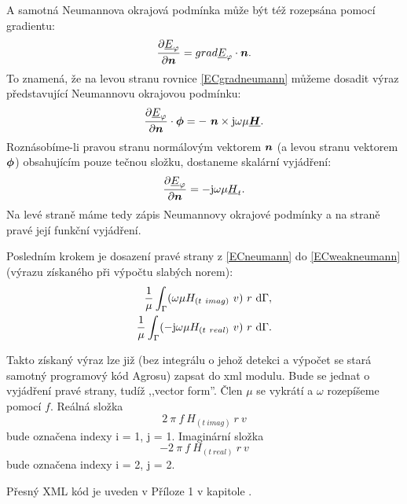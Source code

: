 \documentclass[12pt,a4paper,oneside]{article}
\numberwithin{equation}{section} %
\numberwithin{figure}{section} %
\numberwithin{table}{section} %
\newcommand{\mj}{\mathrm{j}} %
\renewcommand{\vec}[1]{\mbox{\boldmath$#1$}} %
\newcommand{\faz}[1]{{\underline{#1}}} %
\begin{document}
A samotná Neumannova okrajová podmínka může být též rozepsána pomocí gradientu:
\begin{equation}
\label{ECgradneumann}
\frac{\partial \faz{E} _{\varphi}}{\partial \vec{n}} = grad \faz{E} _{\varphi} \cdot \vec{n} .
\end{equation}
To znamená, že na levou stranu rovnice \ref{ECgradneumann} můžeme dosadit výraz představující Neumannovu okrajovou podmínku:
\begin{equation}
\frac{\partial \faz{E}_{\varphi}}{\partial \vec{n}} \cdot \vec{\phi} = - ~ \vec{n} \times \mj \omega \mu \faz{\vec{H}} .
\end{equation}
Roznásobíme-li pravou stranu normálovým vektorem $\vec{n}$ (a levou stranu vektorem $\vec{\phi}$) obsahujícím pouze tečnou složku, dostaneme skalární vyjádření:
\begin{equation}
\label{ECneumann}
\frac{\partial \faz{E}_{\varphi}}{\partial \vec{n}} = - \mj \omega \mu \faz{H}_t .
\end{equation}
Na levé straně máme tedy zápis Neumannovy okrajové podmínky a na straně pravé její funkční vyjádření.

Posledním krokem je dosazení pravé strany z \ref{ECneumann} do \ref{ECweakneumann} (výrazu získaného při výpočtu slabých norem):
\begin{subequations}
\begin{align}
\frac{1}{\mu} \int _{\Gamma} ( \omega \mu H_{(t~imag)} ~ v ) ~ r ~ \ud \Gamma ,
\\ 
\frac{1}{\mu} \int _{\Gamma} ( - \mj \omega \mu H_{(t~real)} ~ v ) ~ r ~ \ud \Gamma .
\end{align}
\end{subequations}

Takto získaný výraz lze již (bez integrálu o jehož detekci a výpočet se stará samotný programový kód Agrosu) zapsat do xml modulu. Bude se jednat o vyjádření pravé strany, tudíž ,,vector form''. Člen $\mu$ se vykrátí a $\omega$ rozepíšeme pomocí $f$. Reálná složka 
\begin{equation}
2 ~ \pi ~ f ~ H_{(t~imag)} ~ r ~ v
\end{equation} 
bude označena indexy i = 1, j = 1. Imaginární složka 
\begin{equation}
- 2 ~ \pi ~ f ~ H_{(t~real)} ~ r ~ v
\end{equation}
bude označena indexy i = 2, j = 2.

Přesný XML kód je uveden v Příloze 1 v kapitole .
\end{document}
